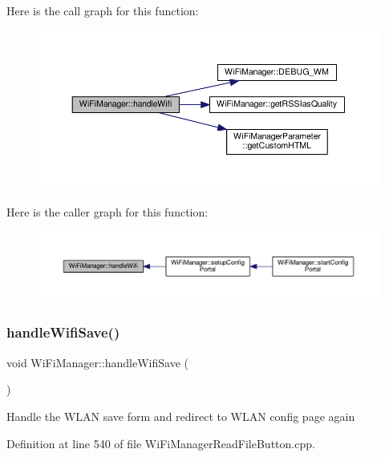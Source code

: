 Here is the call graph for this function\+:\nopagebreak
\begin{figure}[H]
\begin{center}
\leavevmode
\includegraphics[width=350pt]{class_wi_fi_manager_a57a9048175c1918340ab9d0a2c53601f_cgraph}
\end{center}
\end{figure}
Here is the caller graph for this function\+:\nopagebreak
\begin{figure}[H]
\begin{center}
\leavevmode
\includegraphics[width=350pt]{class_wi_fi_manager_a57a9048175c1918340ab9d0a2c53601f_icgraph}
\end{center}
\end{figure}
\mbox{\label{class_wi_fi_manager_a2a8c2b60aa86dfdeab8a1a90f7122dc7}} 
\subsubsection{\texorpdfstring{handle\+Wifi\+Save()}{handleWifiSave()}}
{\footnotesize\ttfamily void Wi\+Fi\+Manager\+::handle\+Wifi\+Save (\begin{DoxyParamCaption}{ }\end{DoxyParamCaption})\hspace{0.3cm}{\ttfamily [private]}}

Handle the W\+L\+AN save form and redirect to W\+L\+AN config page again 

Definition at line 540 of file Wi\+Fi\+Manager\+Read\+File\+Button.\+cpp.

